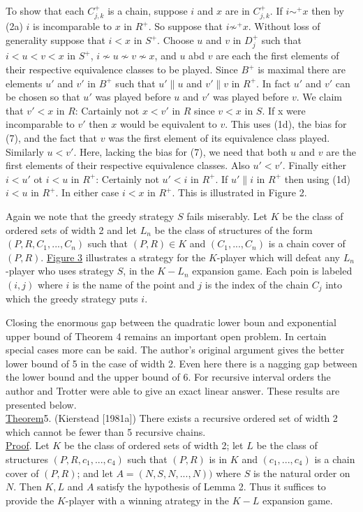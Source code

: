 \documentclass[twoside]{article}
\begin{document}
To show that each $C^+_{j,k}$ is a chain, suppose $i$ and $x$ are in $C^+_{j,k}$. If $i\sim^+x$ then by (2a) $i$ is incomparable to $x$ in $R^+$.
So suppose that $i\not\sim^+x$. Without loss of generality suppose that $i<x$ in $S^+$. Choose $u$ and $v$ in $D^+_j$ such that $i<u<v<x$ in $S^+$,
$i \not\sim u \not\sim v \not\sim x$, and $u$ abd $v$ are each the first elements of their respective equivalence classes to be played. Since $B^+$
is maximal there are elements $u'$ and $v'$ in $B^+$ such that $u' \parallel u$ and $v' \parallel v$ in $R^+$. In fact $u'$ and $v'$
can be chosen so that $u'$ was played before $u$ and $v'$ was played before $v$. We claim that $v'<x$ in $R$: Cartainly not $x<v'$ in $R$ since
$v<x$ in $S$. If x were incomparable to $v'$ then $x$ would be equivalent to $v$. This uses (1d), the bias for (7), and the fact that $v$
was the first element of its equivalence class played. Similarly $u < v'$. Here, lacking the bias for (7), we need that both $u$ and $v$
are the first elements of their respective equivalence classes. Also $u' < v'$. Finally either $i < u'$ ot $i<u$ in $R^+$: Certainly not
$u'<i$ in $R^+$. If $u' \parallel i$ in $R^+$ then using (1d) $i<u$ in $R^+$. In either case $i<x$ in $R^+$. This is illustrated in Figure 2. 

%
%
Again we note that the greedy strategy $S$ fails miserably. Let $K$ be the class of ordered sets of width 2 and let $L_n$ be the class of
structures of the form $(P,R,C_1,...,C_n)$ such that $(P,R) \in K$ and $(C_1,...,C_n)$ is a chain cover of $(P,R)$. \underline{Figure 3}
illustrates a strategy for the $K$-player which will defeat any $L_n$-player who uses strategy $S$, in the $K-L_n$ expansion game.
Each poin is labeled $(i,j)$ where $i$ is the name of the point and $j$ is the index of the chain $C_j$ into which the greedy strategy 
puts $i$.

Closing the enormous gap between the quadratic lower boun and exponential upper bound of Theorem 4 remains an important open problem. 
In certain special cases more can be said. The author's original argument gives the better lower bound of 5 in the case of width 2. 
Even here there is a nagging gap between the lower bound and the upper bound of 6. For recursive interval orders the author and Trotter
were able to give an exact linear answer. These results are presented below.\\
\newline
\underline{Theorem}5. (Kierstead [1981a]) There exists a recursive ordered set of width 2 which cannot be fewer than 5 recursive chains.\\
\newline
\underline{Proof}. Let $K$ be the class of ordered sets of width 2; let $L$ be the class of structures $(P,R,c_1,...,c_4)$
such that $(P,R)$ is in $K$ and $(c_1,...,c_4)$ is a chain cover of $(P,R)$; and let $A=(N,S,N,...,N))$ where $S$ is the natural order on $N$.
Then $K,L$ and $A$ satisfy the hypothesis of Lemma 2. Thus it suffices to provide the $K$-player with a winning atrategy in the $K-L$ expansion
game.
\end{document}
